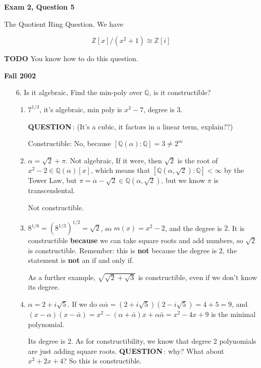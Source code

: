 \documentclass[12pt]{article}
\def\Z{{\mathbb Z}}
\def\Q{{\mathbb Q}}
\def\TODO{\color{red}\textbf{TODO}\color{black}}
\def\QUESTION{\color{red}\textbf{QUESTION}\color{black}\,}
\theoremstyle{remark}
\theoremstyle{remark}
\theoremstyle{remark}
\theoremstyle{remark}
\theoremstyle{remark}
\begin{document}
{\bf Exam 2, Question 5}

The Quotient Ring Question. We have

\[
  \Z[x] / (x^2 + 1) \cong \Z[i]
\]

\TODO{} You know how to do this question.

{\bf Fall 2002}

\begin{enumerate}
  \item[6.] Is it algebraic, Find the min-poly over $\Q$, is it constructible?

    \begin{enumerate}
      \item $7^{1/3}$, it's algebraic, min poly is $x^3 - 7$, degree is $3$.

        \QUESTION: (It's a cubic, it factors in a linear term, explain??)

        Constructible: No, because $[\Q(\alpha) : \Q] = 3 \ne 2^m$

      \item $\alpha = \sqrt{2} + \pi$. Not algebraic, If it were, then
        $\sqrt{2}$ is the root of $x^2 - 2 \in \Q(\alpha)[x]$, which means that
        $[\Q(\alpha, \sqrt{2}) : \Q] < \infty$ by the Tower Law, but $\pi =
        \alpha - \sqrt{2} \in \Q(\alpha, \sqrt{2})$, but we know $\pi$ is
        transcendental.

        Not constructible.

      \item $8^{1/6} = (8^{1/3})^{1/2} = \sqrt{2}$, so $m(x) = x^2 - 2$, and the
        degree is $2$. It is constructible {\bf because} we can take square
        roots and add numbers, so $\sqrt{2}$ is constructible. Remember: this is
        {\bf not} because the degree is $2$, the statement is {\bf not} an if
        and only if.

        As a further example, $\sqrt{\sqrt{2} + \sqrt{3}}$ is constructible,
        even if we don't know its degree.
      \item $\alpha = 2 + i \sqrt{5}$. If we do $\alpha \bar \alpha = (2 +
        i\sqrt{5})(2 - i \sqrt{5}) = 4 + 5 = 9$, and $(x - \alpha)(x - \bar
        \alpha) = x^2 - (\alpha + \bar \alpha)x + \alpha \bar \alpha = x^2 - 4x
        + 9$ is the minimal polynomial.

        Its degree is $2$. As for constructibility, we know that degree 2
        polynomials are just adding square roots. \QUESTION: why? What about
        $x^2 + 2x + 4$? So this is constructible.
    \end{enumerate}


\end{enumerate}
\end{document}
